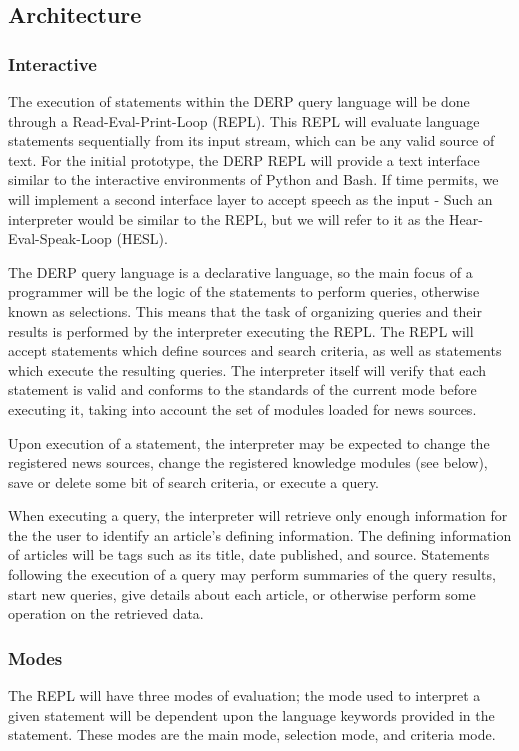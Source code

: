 \subsection{Architecture}

\subsubsection{Interactive}
The execution of statements within the DERP query language will be done through a Read-Eval-Print-Loop (REPL). This REPL will evaluate language statements sequentially from its  input stream, which can be any valid source of text. For the initial prototype, the DERP REPL will provide a text interface similar to the interactive environments of Python and Bash. If time permits, we will implement a second interface layer to accept speech as the input - Such an interpreter would be similar to the REPL, but we will refer to it as the Hear-Eval-Speak-Loop (HESL).

The DERP query language is a declarative language, so the main focus of a programmer will be the logic of the statements to perform queries, otherwise known as selections. This means that the task of organizing queries and their results is performed by the interpreter executing the REPL. The REPL will accept statements which define sources and search criteria, as well as statements which execute the resulting queries. The interpreter itself will verify that each statement is valid and conforms to the standards of the current mode before executing it, taking into account the set of modules loaded for news sources.

Upon execution of a statement, the interpreter may be expected to change the registered news sources, change the registered knowledge modules (see below), save or delete some bit of search criteria, or execute a query.

When executing a query, the interpreter will retrieve only enough information for the the user to identify an article's defining information. The defining information of articles will be tags such as its title, date published, and source. Statements following the execution of a query may perform summaries of the query results, start new queries, give details about each article, or otherwise perform some operation on the retrieved data.

\subsubsection{Modes}
The REPL will have three modes of evaluation; the mode used to interpret a given statement will be dependent upon the language keywords provided in the statement. These modes are the main mode, selection mode, and criteria mode.

